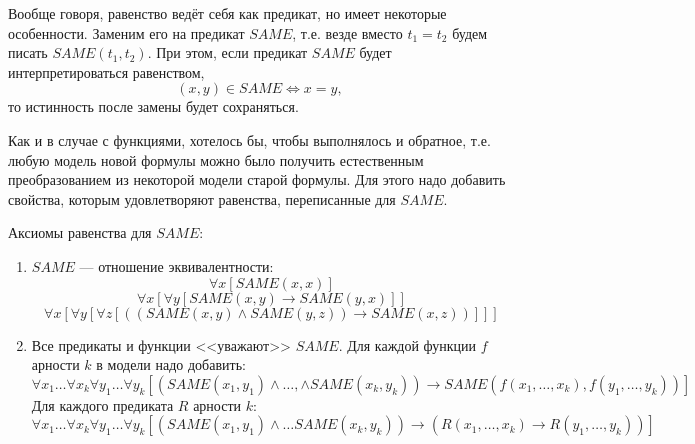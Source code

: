 \documentclass[12pt]{article}
\let\im\rightarrow
\theoremstyle{definition}
\theoremstyle{plain}
\theoremstyle{remark}
\begin{document}
Вообще говоря, равенство ведёт себя как предикат, но имеет некоторые
особенности. Заменим его на предикат $SAME$, т.е. везде вместо $t_1 =
t_2$ будем писать $SAME(t_1, t_2)$. При этом, если предикат $SAME$
будет интерпретироваться равенством,
\[
  (x, y) \in SAME \iff x = y,
\]
то истинность после замены будет сохраняться.

Как и в случае с функциями, хотелось бы, чтобы выполнялось и
обратное, т.е. любую модель новой формулы можно было получить
естественным преобразованием из некоторой модели старой формулы. Для
этого надо добавить свойства, которым удовлетворяют равенства,
переписанные для $SAME$.

Аксиомы равенства для $SAME$:
\begin{enumerate}
  \item $SAME$ --- отношение эквивалентности:
    \[
      \forall x [SAME(x, x)]
    \]
    \[
      \forall x [\forall y [SAME(x, y) \im SAME(y, x)]]
    \]
    \[
      \forall x [\forall y [\forall z [((SAME(x, y) \land SAME(y, z))
      \im SAME(x, z))]]]
    \]

  \item Все предикаты и функции <<уважают>> $SAME$. Для каждой
    функции $f$ арности $k$ в модели надо добавить:
    \[
      \forall x_1 \dots \forall x_k \forall y_1 \dots \forall
      y_k[(SAME(x_1, y_1) \land \dots, \land SAME(x_k, y_k)) \im
      SAME(f(x_1, \dots, x_k), f(y_1, \dots, y_k))]
    \]
    Для каждого предиката $R$ арности $k$:
    \[
      \forall x_1 \dots \forall x_k \forall y_1 \dots \forall y_k
      [(SAME(x_1, y_1) \land \dots SAME(x_k, y_k)) \im (R(x_1, \dots,
      x_k) \im R(y_1, \dots, y_k))]
    \]
\end{enumerate}
\end{document}
